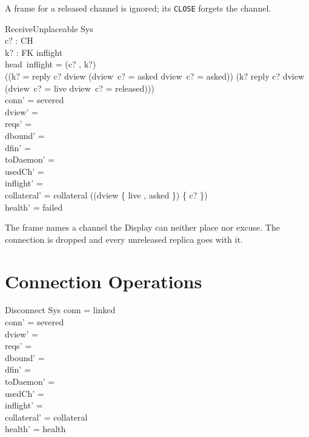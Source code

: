 \documentclass[a4paper,10pt,fleqn]{article}
\begin{document}
A frame for a released channel is ignored; its \texttt{CLOSE} forgets the
channel.

\begin{schema}{ReceiveUnplaceable}
  \Delta Sys \\
  c? : CH \\
  k? : FK
\where
  inflight \neq \langle \rangle \\
  head~inflight = (c? , k?) \\
  \lnot ((k? = reply \land c? \in \dom dview \land
      (dview~c? = asked \lor dview~c? = asked)) \lor
    (k? \neq reply \land c? \in \dom dview \land
      (dview~c? = live \lor dview~c? = released))) \\
  conn' = severed \\
  dview' = \emptyset \\
  reqs' = \emptyset \\
  dbound' = \emptyset \\
  dfin' = \emptyset \\
  toDaemon' = \emptyset \\
  usedCh' = \emptyset \\
  inflight' = \langle \rangle \\
  collateral' = collateral \cup
    (\dom (dview \rres \{ live , asked \}) \setminus \{ c? \}) \\
  health' = failed
\end{schema}

The frame names a channel the Display can neither place nor excuse.  The
connection is dropped and every unreleased replica goes with it.

\section{Connection Operations}

\begin{schema}{Disconnect}
  \Delta Sys
\where
  conn = linked \\
  conn' = severed \\
  dview' = \emptyset \\
  reqs' = \emptyset \\
  dbound' = \emptyset \\
  dfin' = \emptyset \\
  toDaemon' = \emptyset \\
  usedCh' = \emptyset \\
  inflight' = \langle \rangle \\
  collateral' = collateral \\
  health' = health
\end{schema}
\end{document}
